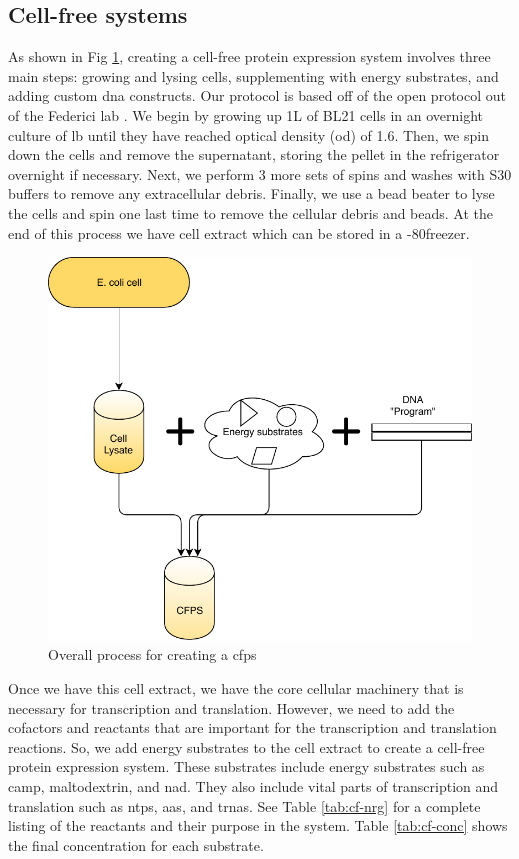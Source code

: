 \subsection{Cell-free systems}
As shown in Fig \ref{fig:cfps}, creating a cell-free protein expression system involves three main steps: growing and lysing cells, supplementing with energy substrates, and adding custom \gls{dna} constructs.
Our protocol is based off of the open protocol out of the Federici lab \cite{medina2017cfps}.
We begin by growing up 1L of BL21 \ecoli cells in an overnight culture of \gls{lb} until they have reached optical density (\gls{od}) of 1.6.
Then, we spin down the cells and remove the supernatant, storing the pellet in the refrigerator overnight if necessary.
Next, we perform 3 more sets of spins and washes with S30 buffers to remove any extracellular debris.
Finally, we use a bead beater to lyse the cells and spin one last time to remove the cellular debris and beads.
At the end of this process we have cell extract which can be stored in a -80\degree freezer.
\begin{figure}[t!]
\begin{center}
\includegraphics{figs/CellFreeSetup.pdf}
\caption{Overall process for creating a \gls{cfps}}
\end{center}
\label{fig:cfps}
\end{figure}

Once we have this cell extract, we have the core cellular machinery that is necessary for transcription and translation.
However, we need to add the cofactors and reactants that are important for the transcription and translation reactions.
So, we add energy substrates to the cell extract to create a cell-free protein expression system.
These substrates include energy substrates such as \gls{camp}, maltodextrin, and \gls{nad}.
They also include vital parts of transcription and translation such as \glspl{ntp}, \glspl{aa}, and \glspl{trna}.
See Table \ref{tab:cf-nrg} for a complete listing of the reactants and their purpose in the system.
Table \ref{tab:cf-conc} shows the final concentration for each substrate.

